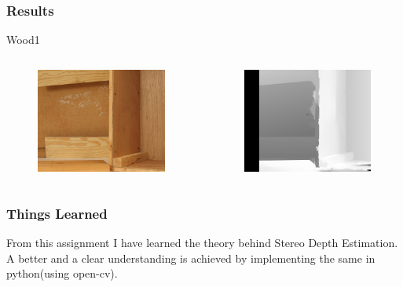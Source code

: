 \documentclass{beamer}
\begin{document}
\begin{frame}
\frametitle{Results}
Wood1
\begin{columns}[c] %

\begin{figure}
\includegraphics[width=0.7\linewidth]{../program/dataset/Wood1/view1.png}
\end{figure}

\begin{figure}
\includegraphics[width=0.7\linewidth]{../program/Result/Wood1.png}
\end{figure}

\end{columns}
\end{frame}



\begin{frame}
\frametitle{Things Learned}
From this assignment I have learned the theory behind Stereo Depth Estimation. A better and a clear understanding is achieved by implementing the same in python(using open-cv).
\end{frame}
\end{document}
